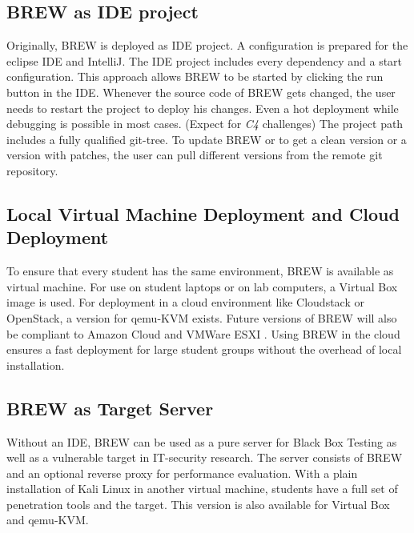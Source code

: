 \documentclass{llncs}
\begin{document}
\subsection{BREW as IDE project}
Originally, BREW is deployed as IDE project. A configuration is prepared for the eclipse IDE and IntelliJ. The IDE project includes every dependency and a start configuration. This approach allows BREW to be started by clicking the run button in the IDE. Whenever the source code of BREW gets changed, the user needs to restart the project to deploy his changes. Even a hot deployment while debugging is possible in most cases. (Expect for {\em C4} challenges)
The project path includes a fully qualified git-tree. To update BREW or to get a clean version or a version with patches, the user can pull different versions from the remote git repository. 

\subsection{Local Virtual Machine Deployment and Cloud Deployment}
To ensure that every student has the same environment, BREW is available as virtual machine. For use on student laptops or on lab computers, a Virtual Box image is used. For deployment in a cloud environment like Cloudstack or OpenStack, a version for qemu-KVM exists. Future versions of BREW will also be compliant to Amazon Cloud and VMWare ESXI \cite{vmware2014}. Using BREW in the cloud ensures a fast deployment for large student groups without the overhead of local installation. 

\subsection{BREW as Target Server}
Without an IDE, BREW can be used as a pure server for Black Box Testing as well as a vulnerable target in IT-security research. The server consists of BREW and an optional reverse proxy for performance evaluation.
With a plain installation of Kali Linux in another virtual machine, students have a full set of penetration tools and the target.
This version is also available for Virtual Box and qemu-KVM.
\end{document}
